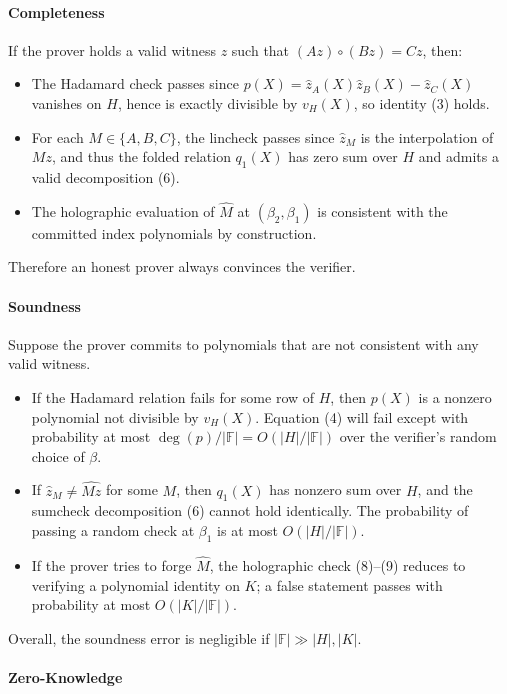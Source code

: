 \paragraph{Completeness}

If the prover holds a valid witness $z$ such that $(Az)\circ(Bz) = Cz$, then:
\begin{itemize}
    \item The Hadamard check passes since $p(X) = \hat z_A(X)\hat z_B(X) - \hat z_C(X)$ vanishes on $H$, hence is exactly divisible by $v_H(X)$, so identity (3) holds.
    \item For each $M \in \{A,B,C\}$, the lincheck passes since $\hat z_M$ is the interpolation of $Mz$, and thus the folded relation $q_1(X)$ has zero sum over $H$ and admits a valid decomposition (6).
    \item The holographic evaluation of $\hat M$ at $(\beta_2,\beta_1)$ is consistent with the committed index polynomials by construction.
\end{itemize}
Therefore an honest prover always convinces the verifier.


\paragraph{Soundness}

Suppose the prover commits to polynomials that are not consistent with any valid witness.
\begin{itemize}
    \item If the Hadamard relation fails for some row of $H$, then $p(X)$ is a nonzero polynomial not divisible by $v_H(X)$. Equation (4) will fail except with probability at most $\deg(p)/|\mathbb{F}| = O(|H|/|\mathbb{F}|)$ over the verifier’s random choice of $\beta$.
    \item If $\hat z_M \neq \widehat{Mz}$ for some $M$, then $q_1(X)$ has nonzero sum over $H$, and the sumcheck decomposition (6) cannot hold identically. The probability of passing a random check at $\beta_1$ is at most $O(|H|/|\mathbb{F}|)$.
    \item If the prover tries to forge $\hat M$, the holographic check (8)--(9) reduces to verifying a polynomial identity on $K$; a false statement passes with probability at most $O(|K|/|\mathbb{F}|)$.
\end{itemize}
Overall, the soundness error is negligible if $|\mathbb{F}| \gg |H|,|K|$.


\paragraph{Zero-Knowledge}


